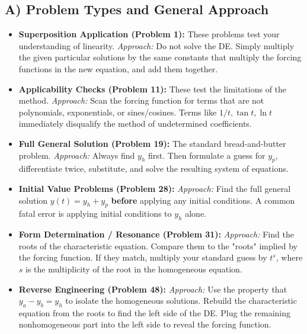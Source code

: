 \documentclass[12pt]{article}
\begin{document}
\subsection{A) Problem Types and General Approach}
\begin{itemize}
    \item \textbf{Superposition Application (Problem 1):} These problems test your understanding of linearity. \textit{Approach:} Do not solve the DE. Simply multiply the given particular solutions by the same constants that multiply the forcing functions in the new equation, and add them together.
    \item \textbf{Applicability Checks (Problem 11):} These test the limitations of the method. \textit{Approach:} Scan the forcing function for terms that are not polynomials, exponentials, or sines/cosines. Terms like $1/t, \tan t, \ln t$ immediately disqualify the method of undetermined coefficients.
    \item \textbf{Full General Solution (Problem 19):} The standard bread-and-butter problem. \textit{Approach:} Always find $y_h$ first. Then formulate a guess for $y_p$, differentiate twice, substitute, and solve the resulting system of equations.
    \item \textbf{Initial Value Problems (Problem 28):} \textit{Approach:} Find the full general solution $y(t) = y_h + y_p$ \textbf{before} applying any initial conditions. A common fatal error is applying initial conditions to $y_h$ alone.
    \item \textbf{Form Determination / Resonance (Problem 31):} \textit{Approach:} Find the roots of the characteristic equation. Compare them to the "roots" implied by the forcing function. If they match, multiply your standard guess by $t^s$, where $s$ is the multiplicity of the root in the homogeneous equation.
    \item \textbf{Reverse Engineering (Problem 48):} \textit{Approach:} Use the property that $y_a - y_b = y_h$ to isolate the homogeneous solutions. Rebuild the characteristic equation from the roots to find the left side of the DE. Plug the remaining nonhomogeneous part into the left side to reveal the forcing function.
\end{itemize}
\end{document}
